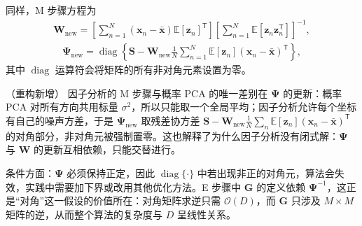 \documentclass[../../main.tex]{subfiles}
\begin{document}
同样，M 步骤方程为
\begin{align}
  \bm{W}_{\text{new}}=\left[\sum_{n=1}^{N}(\bm{x}_n-\bar{\bm{x}})\mathbb{E}[\bm{z}_n]^{\mathsf T}\right]\left[\sum_{n=1}^{N}\mathbb{E}[\bm{z}_n\bm{z}_n^{\mathsf T}]\right]^{-1},
  \label{align:ch16-FA-M步W}
\end{align}
\begin{align}
  \bm{\Psi}_{\text{new}}=\operatorname{diag}\left\{\bm{S}-\bm{W}_{\text{new}}\frac{1}{N}\sum_{n=1}^{N}\mathbb{E}[\bm{z}_n](\bm{x}_n-\bar{\bm{x}})^{\mathsf T}\right\},
  \label{align:ch16-FA-M步Psi}
\end{align}
其中 $\operatorname{diag}$ 运算符会将矩阵的所有非对角元素设置为零。

\begin{remark}（重构新增）
因子分析的 M 步骤与概率 PCA 的唯一差别在 $\bm{\Psi}$ 的更新：概率 PCA 对所有方向共用标量 $\sigma^2$，所以只能取一个全局平均；因子分析允许每个坐标有自己的噪声方差，于是 $\bm{\Psi}_{\text{new}}$ 取残差协方差 $\bm{S}-\bm{W}_{\text{new}}\frac{1}{N}\sum_n\mathbb{E}[\bm{z}_n](\bm{x}_n-\bar{\bm{x}})^{\mathsf T}$ 的对角部分，非对角元被强制置零。这也解释了为什么因子分析没有闭式解：$\bm{\Psi}$ 与 $\bm{W}$ 的更新互相依赖，只能交替进行。

条件方面：$\bm{\Psi}$ 必须保持正定，因此 $\operatorname{diag}\{\cdot\}$ 中若出现非正的对角元，算法会失效，实践中需要加下界或改用其他优化方法。E 步骤中 $\bm{G}$ 的定义依赖 $\bm{\Psi}^{-1}$，这正是“对角”这一假设的价值所在：对角矩阵求逆只需 $\mathcal{O}(D)$，而 $\bm{G}$ 只涉及 $M\times M$ 矩阵的逆，从而整个算法的复杂度与 $D$ 呈线性关系。
\end{remark}
\end{document}
